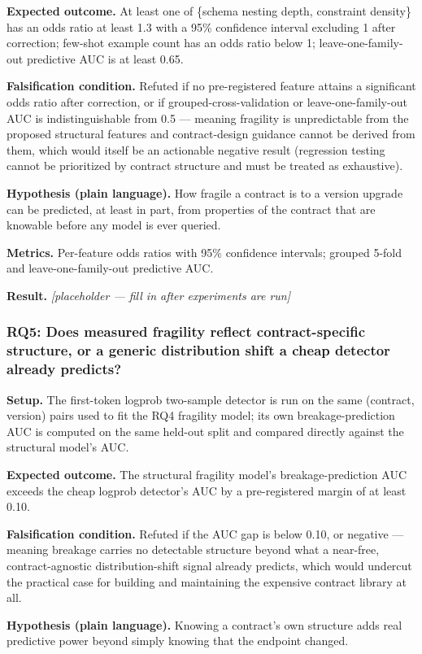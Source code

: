 \documentclass[11pt]{article}
\newcommand{\ph}{\textit{[placeholder --- fill in after experiments are run]}}
\begin{document}
\textbf{Expected outcome.} At least one of \{schema nesting depth, constraint density\} has an odds ratio at least 1.3 with a 95\% confidence interval excluding 1 after correction; few-shot example count has an odds ratio below 1; leave-one-family-out predictive AUC is at least 0.65.

\textbf{Falsification condition.} Refuted if no pre-registered feature attains a significant odds ratio after correction, or if grouped-cross-validation or leave-one-family-out AUC is indistinguishable from 0.5 --- meaning fragility is unpredictable from the proposed structural features and contract-design guidance cannot be derived from them, which would itself be an actionable negative result (regression testing cannot be prioritized by contract structure and must be treated as exhaustive).

\textbf{Hypothesis (plain language).} How fragile a contract is to a version upgrade can be predicted, at least in part, from properties of the contract that are knowable before any model is ever queried.

\textbf{Metrics.} Per-feature odds ratios with 95\% confidence intervals; grouped 5-fold and leave-one-family-out predictive AUC.

\textbf{Result.} \ph

\subsubsection{RQ5: Does measured fragility reflect contract-specific structure, or a generic distribution shift a cheap detector already predicts?}
\textbf{Setup.} The first-token logprob two-sample detector is run on the same (contract, version) pairs used to fit the RQ4 fragility model; its own breakage-prediction AUC is computed on the same held-out split and compared directly against the structural model's AUC.

\textbf{Expected outcome.} The structural fragility model's breakage-prediction AUC exceeds the cheap logprob detector's AUC by a pre-registered margin of at least 0.10.

\textbf{Falsification condition.} Refuted if the AUC gap is below 0.10, or negative --- meaning breakage carries no detectable structure beyond what a near-free, contract-agnostic distribution-shift signal already predicts, which would undercut the practical case for building and maintaining the expensive contract library at all.

\textbf{Hypothesis (plain language).} Knowing a contract's own structure adds real predictive power beyond simply knowing that the endpoint changed.
\end{document}
